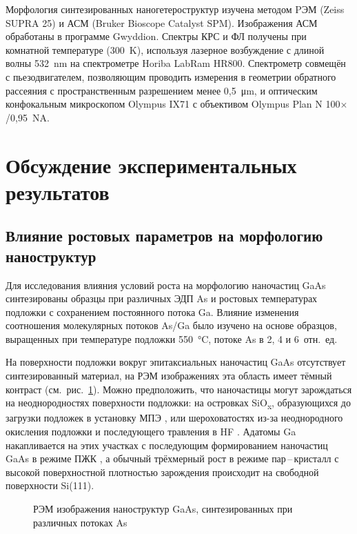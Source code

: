 Морфология синтезированных наногетероструктур изучена методом PЭМ (Zeiss SUPRA
25) и АСМ (Bruker Bioscope Catalyst SPM). Изображения АСМ обработаны в
программе Gwyddion. Спектры КРС и ФЛ получены при комнатной температуре
(300~\si{\kelvin}), используя лазерное возбуждение с длиной волны
532~\si{\nano\metre} на спектрометре Horiba LabRam HR800. Спектрометр совмещён
с пьезодвигателем, позволяющим проводить измерения в геометрии обратного
рассеяния с пространственным разрешением менее 0,5~\si{\micro\metre}, и
оптическим конфокальным микроскопом Olympus IX71 с объективом Olympus Plan N
100\(\times\)/0,95~NA.

\section{Обсуждение экспериментальных результатов}\label{sec:ch5/sec2}

\subsection{Влияние ростовых параметров на морфологию
наноструктур}\label{subsec:ch5/sec2/sub1}

Для исследования влияния условий роста на морфологию наночастиц GaAs
синтезированы образцы при различных ЭДП As и ростовых температурах подложки с
сохранением постоянного потока Ga. Влияние изменения соотношения молекулярных
потоков As/Ga было изучено на основе образцов, выращенных при температуре
подложки 550~\si{\degreeCelsius}, потоке As в 2, 4 и 6~отн.~ед.

На поверхности подложки вокруг эпитаксиальных наночастиц GaAs отсутствует
синтезированный материал, на РЭМ изображениях эта область имеет тёмный контраст
(см.~рис.~\cref{fig:Image_31}). Можно предположить, что наночастицы могут
зарождаться на неоднородностях поверхности подложки: на островках
SiO\textsubscript{x}, образующихся до загрузки подложек в установку МПЭ
\cite{Miura1996, Ogawa1996}, или шероховатостях из-за неоднородного окисления
подложки и последующего травления в HF \cite{Neuwald1992, Jakob1991}. Адатомы
Ga накапливается на этих участках с последующим формированием наночастиц GaAs в
режиме ПЖК \cite{Dubrovskii2012a}, а обычный трёхмерный рост в режиме
пар\,--\,кристалл с высокой поверхностной плотностью зарождения происходит на
свободной поверхности Si(111).

\begin{figure}[ht]   \caption{РЭМ изображения наноструктур GaAs,
				синтезированных при различных потоках As}\label{fig:Image_31}
			\end{figure}


